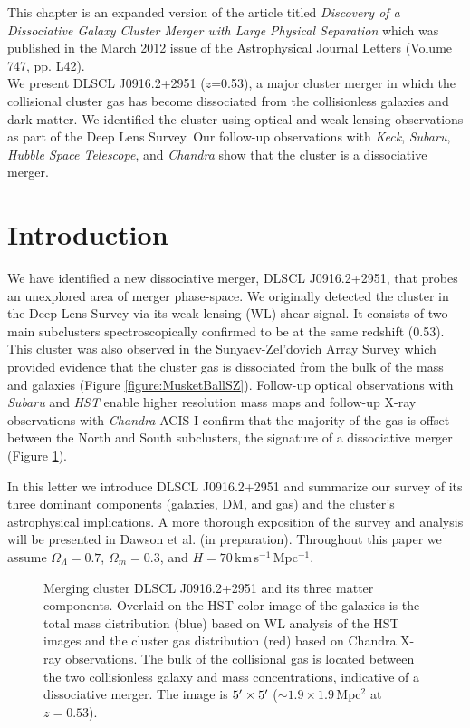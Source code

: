 \label{chapter:2}

\noindent This chapter is an expanded version of the article titled \emph{Discovery of a Dissociative Galaxy Cluster Merger with Large Physical Separation} which was published in the March 2012 issue of the Astrophysical Journal Letters (Volume 747, pp. L42). \\

We present DLSCL J0916.2+2951 ($z$=0.53), a major cluster merger in which the collisional cluster gas has become dissociated from the collisionless galaxies and dark matter.
We identified the cluster using optical and weak lensing observations as part of the Deep Lens Survey. 
Our follow-up observations with {\it Keck}, {\it Subaru}, {\it Hubble Space Telescope}, and {\it Chandra} show that the cluster is a dissociative merger.


\section{Introduction}

We have identified a new dissociative merger, DLSCL J0916.2+2951, that probes an unexplored area of merger phase-space.  
We originally detected the cluster in the Deep Lens Survey \citep[DLS;][]{Wittman:2002cp} via its weak lensing (WL) shear signal. 
It consists of two main subclusters  spectroscopically confirmed to be at the same redshift (0.53).
This cluster was also observed in the Sunyaev-Zel'dovich Array Survey \citep{Muchovej:2010gc} which provided evidence that the cluster gas is dissociated from the bulk of the mass and galaxies (Figure \ref{figure:MusketBallSZ}).
Follow-up optical observations with {\it Subaru} and {\it HST} enable higher resolution mass maps and follow-up X-ray observations with {\it Chandra} ACIS-I confirm that the majority of the gas is offset between the North and South subclusters, the signature of a dissociative merger (Figure \ref{fig1}).

In this letter we introduce DLSCL J0916.2+2951 and summarize our survey of its three dominant components (galaxies, DM, and gas) and the cluster's astrophysical implications.
A more thorough exposition of the survey and analysis will be presented in Dawson et al. (in preparation).
Throughout this paper we assume $\Omega_{\Lambda}=0.7$, $\Omega_m=0.3$, and $H=70$\,km\,s$^{-1}$\,Mpc$^{-1}$.

\begin{figure}
\caption[Merging cluster DLSCL J0916.2+2951 and its three matter components.]{Merging cluster DLSCL J0916.2+2951 and its three matter components. 
Overlaid on the HST color image of the galaxies is the total mass distribution (blue) based on WL analysis of the HST images and the cluster gas distribution (red) based on Chandra X-ray observations.  
The bulk of the collisional gas is located between the two collisionless galaxy and mass concentrations, indicative of a dissociative merger. 
The image is $5\mbox{$^\prime$} \times 5\mbox{$^\prime$}$ ($\sim 1.9\times 1.9$\,Mpc$^2$ at $z=0.53$).\label{fig1}}
\end{figure}

